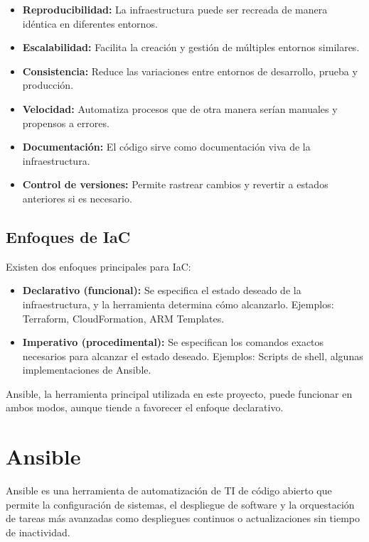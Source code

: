 \documentclass[12pt,a4paper]{report}
\begin{document}
\begin{itemize}
    \item \textbf{Reproducibilidad:} La infraestructura puede ser recreada de manera idéntica en diferentes entornos.
    \item \textbf{Escalabilidad:} Facilita la creación y gestión de múltiples entornos similares.
    \item \textbf{Consistencia:} Reduce las variaciones entre entornos de desarrollo, prueba y producción.
    \item \textbf{Velocidad:} Automatiza procesos que de otra manera serían manuales y propensos a errores.
    \item \textbf{Documentación:} El código sirve como documentación viva de la infraestructura.
    \item \textbf{Control de versiones:} Permite rastrear cambios y revertir a estados anteriores si es necesario.
\end{itemize}

\subsection{Enfoques de IaC}

Existen dos enfoques principales para IaC:

\begin{itemize}
    \item \textbf{Declarativo (funcional):} Se especifica el estado deseado de la infraestructura, y la herramienta determina cómo alcanzarlo. Ejemplos: Terraform, CloudFormation, ARM Templates.
    \item \textbf{Imperativo (procedimental):} Se especifican los comandos exactos necesarios para alcanzar el estado deseado. Ejemplos: Scripts de shell, algunas implementaciones de Ansible.
\end{itemize}

Ansible, la herramienta principal utilizada en este proyecto, puede funcionar en ambos modos, aunque tiende a favorecer el enfoque declarativo.

\section{Ansible}

Ansible es una herramienta de automatización de TI de código abierto que permite la configuración de sistemas, el despliegue de software y la orquestación de tareas más avanzadas como despliegues continuos o actualizaciones sin tiempo de inactividad.
\end{document}
